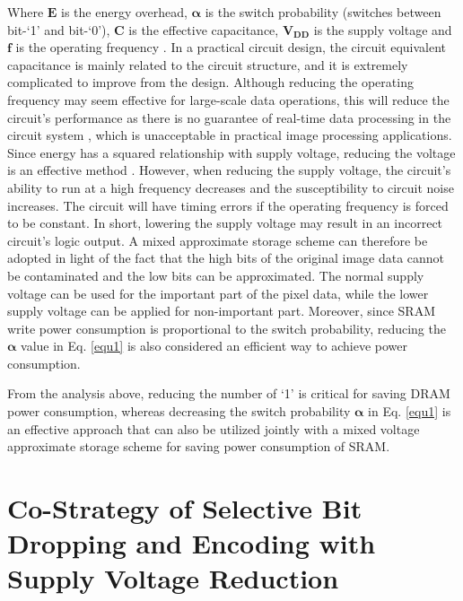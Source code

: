 \documentclass[lettersize,journal]{IEEEtran}
\begin{document}
Where $\boldsymbol{E}$ is the energy overhead, $\boldsymbol{\alpha}$ is the switch probability (switches between bit-`1' and bit-`0'), $\boldsymbol{C}$ is the effective capacitance, $\boldsymbol{V}_{\boldsymbol{DD}}$ is the supply voltage and $\boldsymbol{f}$ is the operating frequency \cite{6387646}. In a practical circuit design, the circuit equivalent capacitance is mainly related to the circuit structure, and it is extremely complicated to improve from the design. Although reducing the operating frequency may seem effective for large-scale data operations, this will reduce the circuit’s performance as there is no guarantee of real-time data processing in the circuit system \cite{6152179}, which is unacceptable in practical image processing applications. Since energy has a squared relationship with supply voltage, reducing the voltage is an effective method \cite{6409436}. However, when reducing the supply voltage, the circuit’s ability to run at a high frequency decreases and the susceptibility to circuit noise increases. The circuit will have timing errors if the operating frequency is forced to be constant. In short, lowering the supply voltage may result in an incorrect circuit's logic output. A mixed approximate storage scheme can therefore be adopted in light of the fact that the high bits of the original image data cannot be contaminated and the low bits can be approximated. The normal supply voltage can be used for the important part of the pixel data, while the lower supply voltage can be applied for non-important part. Moreover, since SRAM write power consumption is proportional to the switch probability, reducing the $\boldsymbol{\alpha}$ value in Eq. \eqref{equ1} is also considered an efficient way to achieve power consumption.

From the analysis above, reducing the number of `1' is critical for saving DRAM power consumption, whereas decreasing the switch probability $\boldsymbol{\alpha}$ in Eq. \eqref{equ1} is an effective approach that can also be utilized jointly with a mixed voltage approximate storage scheme for saving power consumption of SRAM.




\section{Co-Strategy of Selective Bit Dropping and Encoding with Supply Voltage Reduction } \label{sec3}
\end{document}
